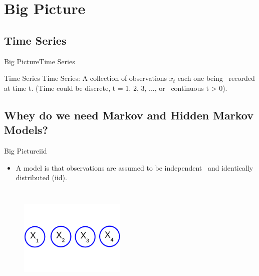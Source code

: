 \documentclass[10pt]{beamer}
\begin{document}
\section{Big Picture}
\subsection{Time Series}
\begin{frame}{Big Picture}{Time Series}
  \begin{block}{Time Series}
          Time Series: A collection of observations $x_t$ each one being \
          recorded at time t. (Time could be discrete, t = 1, 2, 3, ..., or \
          continuous t > 0). \cite{Richard}
  \end{block}
\end{frame}

\subsection{Whey do we need Markov and Hidden Markov Models?}
\begin{frame}{Big Picture}{iid}
  \begin{itemize}
    \item A model is that observations are assumed to be independent \
          and identically distributed (iid). \cite{Thomas}
  \end{itemize}
  \begin{figure}[h]
    \centering
    \includegraphics[width=2in,height=2in]{figures/idd.png}
  \end{figure}
\end{frame}
\end{document}

